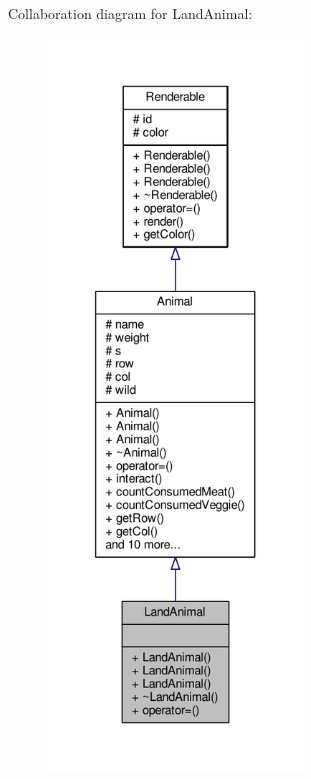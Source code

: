 Collaboration diagram for Land\+Animal\+:
\nopagebreak
\begin{figure}[H]
\begin{center}
\leavevmode
\includegraphics[height=550pt]{classLandAnimal__coll__graph}
\end{center}
\end{figure}
